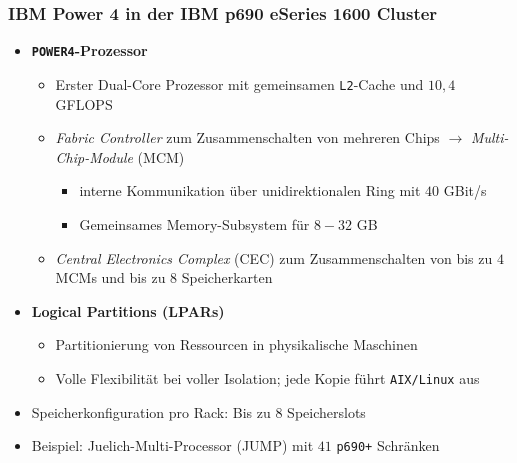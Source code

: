 \subsubsection{IBM Power 4 in der IBM p690 eSeries 1600 Cluster}
\begin{itemize}
	\item \textbf{\texttt{POWER4}-Prozessor}
	\begin{itemize}
		\item Erster Dual-Core Prozessor mit gemeinsamen \texttt{L2}-Cache und \(10,4\) GFLOPS
		\item \textit{Fabric Controller} zum Zusammenschalten von mehreren Chips \(\rightarrow\) \textit{Multi-Chip-Module} (MCM)
		\begin{itemize}
			\item interne Kommunikation über unidirektionalen Ring mit \(40\) GBit/s
			\item Gemeinsames Memory-Subsystem für \(8-32\) GB
		\end{itemize}
		\item \textit{Central Electronics Complex} (CEC) zum Zusammenschalten von bis zu \(4\) MCMs und bis zu \(8\) Speicherkarten
	\end{itemize}
	\item \textbf{Logical Partitions (LPARs)}
	\begin{itemize}
		\item Partitionierung von Ressourcen in physikalische Maschinen
		\item Volle Flexibilität bei voller Isolation; jede Kopie führt \texttt{AIX/Linux} aus
	\end{itemize}
	\item Speicherkonfiguration pro Rack: Bis zu \(8\) Speicherslots
	\item Beispiel: Juelich-Multi-Processor (JUMP) mit \(41\) \texttt{p690+} Schränken
\end{itemize}


